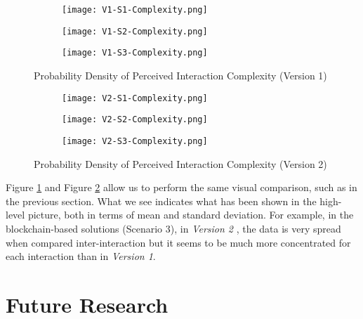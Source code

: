 \begin{figure}[htb]
	\centering
	\begin{subfigure}[b]{0.49\textwidth}
		\centering
		\texttt{[image: V1-S1-Complexity.png]}
	\end{subfigure}
	\begin{subfigure}[b]{0.49\textwidth}
		\centering
		\texttt{[image: V1-S2-Complexity.png]}
	\end{subfigure}
	\hfill
	\begin{subfigure}[b]{0.49\textwidth}
		\centering
		\texttt{[image: V1-S3-Complexity.png]}
	\end{subfigure}

	\caption{Probability Density of Perceived Interaction Complexity (Version 1)}
	\label{fig: perceivedInteractionComplexityOne}
\end{figure}

\begin{figure}[htb]
	\centering
	\begin{subfigure}[b]{0.49\textwidth}
		\centering
		\texttt{[image: V2-S1-Complexity.png]}
	\end{subfigure}
	\begin{subfigure}[b]{0.49\textwidth}
		\centering
		\texttt{[image: V2-S2-Complexity.png]}
	\end{subfigure}
	\hfill
	\begin{subfigure}[b]{0.49\textwidth}
		\centering
		\texttt{[image: V2-S3-Complexity.png]}
	\end{subfigure}

	\caption{Probability Density of Perceived Interaction Complexity (Version 2)}
	\label{fig: perceivedInteractionComplexityTwo}
\end{figure}

Figure \ref{fig: perceivedInteractionComplexityOne} and Figure \ref{fig: perceivedInteractionComplexityTwo} allow us to perform the same visual comparison, such as in the previous section. What we see indicates what has been shown in the high-level picture, both in terms of mean and standard deviation. For example, in the blockchain-based solutions (Scenario 3), in \textit{Version 2} , the data is very spread when compared inter-interaction but it seems to be much more concentrated for each interaction than in \textit{Version 1}.

\section{Future Research}

